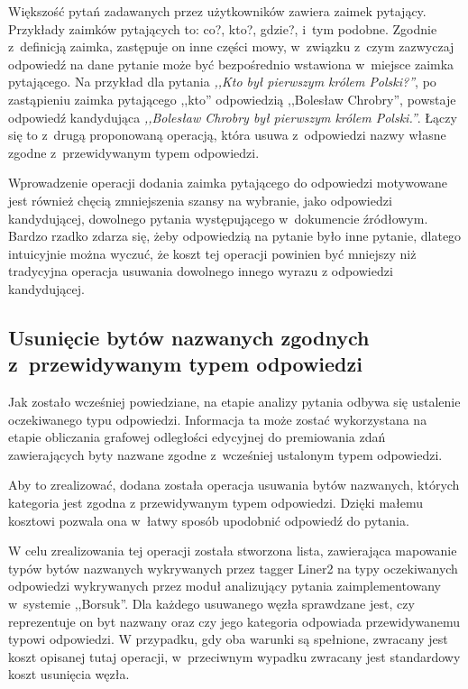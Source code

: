 \documentclass[a4paper, twoside, openright, 12pt]{report}
\begin{document}
            Większość pytań zadawanych przez użytkowników zawiera zaimek pytający. Przykłady zaimków pytających to: co?,
            kto?, gdzie?, i~tym podobne. Zgodnie z~definicją zaimka, zastępuje on inne części mowy, w~związku z~czym
            zazwyczaj odpowiedź na dane pytanie może być bezpośrednio wstawiona w~miejsce
            zaimka pytającego. Na przykład dla pytania \emph{,,Kto był pierwszym królem Polski?''}, po zastąpieniu zaimka
            pytającego ,,kto'' odpowiedzią ,,Bolesław Chrobry'', powstaje odpowiedź kandydująca
            \emph{,,Bolesław Chrobry był pierwszym królem Polski.''}. Łączy się to z~drugą proponowaną operacją, która
            usuwa z~odpowiedzi nazwy własne zgodne z~przewidywanym typem odpowiedzi.

            Wprowadzenie operacji dodania zaimka pytającego do odpowiedzi motywowane jest również chęcią zmniejszenia
            szansy na wybranie, jako odpowiedzi kandydującej, dowolnego pytania występującego w~dokumencie źródłowym.
            Bardzo rzadko zdarza się, żeby odpowiedzią na pytanie było inne pytanie, dlatego intuicyjnie można wyczuć,
            że koszt tej operacji powinien być mniejszy niż tradycyjna operacja usuwania dowolnego innego wyrazu z
            odpowiedzi kandydującej.

        \subsection{Usunięcie bytów nazwanych zgodnych z~przewidywanym typem odpowiedzi}
            Jak zostało wcześniej powiedziane, na etapie analizy pytania odbywa się ustalenie oczekiwanego typu odpowiedzi.
            Informacja ta może zostać wykorzystana na etapie obliczania grafowej odległości edycyjnej do premiowania
            zdań zawierających byty nazwane zgodne z~wcześniej ustalonym typem odpowiedzi.

            Aby to zrealizować, dodana została operacja usuwania bytów nazwanych, których kategoria jest zgodna z
            przewidywanym typem odpowiedzi. Dzięki małemu kosztowi pozwala ona w~łatwy sposób upodobnić odpowiedź
            do pytania.

            W celu zrealizowania tej operacji została stworzona lista, zawierająca mapowanie typów bytów nazwanych
            wykrywanych przez tagger Liner2\cite{LINER2} na typy oczekiwanych odpowiedzi wykrywanych przez moduł analizujący pytania
            zaimplementowany w~systemie ,,Borsuk''. Dla każdego usuwanego węzła sprawdzane jest, czy reprezentuje on
            byt nazwany oraz czy jego kategoria odpowiada przewidywanemu typowi odpowiedzi. W przypadku, gdy oba warunki
            są spełnione, zwracany jest koszt opisanej tutaj operacji, w~przeciwnym wypadku zwracany jest standardowy koszt
            usunięcia węzła.
\end{document}
